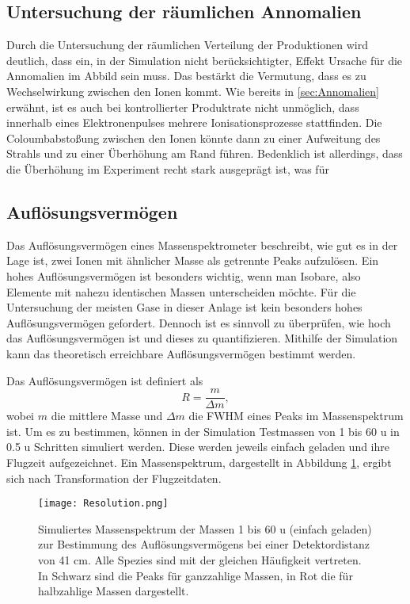 \subsection{Untersuchung der räumlichen Annomalien}
Durch die Untersuchung der räumlichen Verteilung der Produktionen wird deutlich, dass ein, in der Simulation nicht berücksichtigter, Effekt Ursache für die Annomalien im Abbild sein muss. Das bestärkt die Vermutung, dass es zu Wechselwirkung zwischen den Ionen kommt. Wie bereits in \ref{sec:Annomalien} erwähnt, ist es auch bei kontrollierter Produktrate nicht unmöglich, dass innerhalb eines Elektronenpulses mehrere Ionisationsprozesse stattfinden. Die Coloumbabstoßung zwischen den Ionen könnte dann zu einer Aufweitung des Strahls und zu einer Überhöhung am Rand führen. Bedenklich ist allerdings, dass die Überhöhung im Experiment recht stark ausgeprägt ist, was für 

\label{sec:delay}
\subsection{Auflösungsvermögen}
Das Auflösungsvermögen eines Massenspektrometer beschreibt, wie gut es in der Lage ist, zwei Ionen mit ähnlicher Masse als getrennte Peaks aufzulösen. Ein hohes Auflösungsvermögen ist besonders wichtig, wenn man Isobare, also Elemente mit nahezu identischen Massen unterscheiden möchte. Für die Untersuchung der meisten Gase in dieser Anlage ist kein besonders hohes Auflösungsvermögen gefordert. Dennoch ist es sinnvoll zu überprüfen, wie hoch das Auflösungsvermögen ist und dieses zu quantifizieren. Mithilfe der Simulation kann das theoretisch erreichbare Auflösungsvermögen bestimmt werden. 

Das Auflösungsvermögen ist definiert als 
\begin{equation}
    R = \frac{m}{\Delta m},
\end{equation}
wobei $m$ die mittlere Masse und $\Delta m$ die FWHM eines Peaks im Massenspektrum ist. Um es zu bestimmen, können in der Simulation Testmassen von 1 bis 60 u in 0.5 u Schritten simuliert werden. Diese werden jeweils einfach geladen und ihre Flugzeit aufgezeichnet. Ein Massenspektrum, dargestellt in Abbildung \ref{fig:res}, ergibt sich nach Transformation der Flugzeitdaten.

\begin{figure}
    \centering
    \texttt{[image: Resolution.png]}
    \caption[Simuliertes Massenspektrum zur Bestimmung des Auflösungsvermögens]{Simuliertes Massenspektrum der Massen 1 bis 60 u (einfach geladen) zur Bestimmung des Auflösungsvermögens bei einer Detektordistanz von 41 cm. Alle Spezies sind mit der gleichen Häufigkeit vertreten. In Schwarz sind die Peaks für ganzzahlige Massen, in Rot die für halbzahlige Massen dargestellt.}
    \label{fig:res}
\end{figure}

